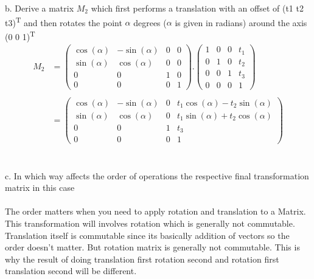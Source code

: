 \documentclass[10pt,a4paper]{article}
\begin{document}
b. Derive a matrix $M_2$ which first performs a translation with an offset of (t1 t2 t3)\textsuperscript{T}  and then rotates the point $\alpha$ degrees ($\alpha$ is given in radians) around the axis (0 0 1)\textsuperscript{T} \\

\begin{equation*} \label{eq_M1}
\begin{aligned}
M_2 &= 
  \begin{pmatrix}
    \cos(\alpha) & -\sin(\alpha) & 0 & 0 \\
    \sin(\alpha) & \cos(\alpha) & 0 & 0\\
    0 & 0 & 1 & 0 \\
    0 & 0 & 0 & 1
  \end{pmatrix} . 
    \begin{pmatrix}
    1 & 0 & 0 & t_1 \\
    0 & 1 & 0 & t_2\\
    0 & 0 & 1 & t_3 \\
    0 & 0 & 0 & 1
  \end{pmatrix} \\ \\
  &= 
  \begin{pmatrix}
    \cos(\alpha) & -\sin(\alpha) & 0 & t_1\cos(\alpha) - t_2\sin(\alpha) \\
    \sin(\alpha) & \cos(\alpha) & 0 & t_1\sin(\alpha) + t_2\cos(\alpha) \\
    0 & 0 & 1 & t_3 \\
    0 & 0 & 0 & 1
  \end{pmatrix}
\end{aligned}
\end{equation*} \\ \\


c. In which way affects the order of operations the respective final transformation matrix in this case \\ \\
The order matters when you need to apply rotation and translation to a Matrix. This transformation will involves rotation which is generally not commutable. Translation itself is commutable since its basically addition of vectors so the order doesn't matter. But rotation matrix is generally not commutable. This is why the result of doing translation first rotation second and rotation first translation second will be different.
\end{document}
